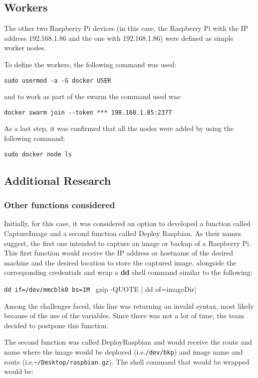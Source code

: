 \subsection{Workers}

The other two Raspberry Pi devices (in this case, the Raspberry Pi
with the IP address 192.168.1.86 and the one with 192.168.1.86) were
defined as simple worker nodes.
  
To define the workers, the following command was used:

\verb|sudo usermod -a -G docker USER|

and to work as part of the swarm the command used was:

\verb|docker swarm join --token *** 198.168.1.85:2377| 

As a
last step, it was confirmed that all the nodes were added by using the
following command: 

\verb|sudo docker node ls|
	
\subsection{Additional Research}
	
\subsubsection{Other functions considered}

Initially, for this case, it was considered an option to developed a
function called CaptureImage and a second function called Deploy
Raspbian.  As their names suggest, the first one intended to capture
an image or backup of a Raspberry Pi.  This first function would
receive the IP address or hostname of the desired machine and the
desired location to store the captured image, alongside the
corresponding credentials and wrap
a \textbf{dd} shell command similar to the following:

\verb|dd if=/dev/mmcblk0 bs=1M | gzip -QUOTE | dd of=imageDir|

Among the challenges faced, this line was returning an invalid syntax,
most likely because of the use of the variables.  Since there was not
a lot of time, the team decided to
postpone this function.
	
The second function was called DeployRaspbian and would receive the
route and name where the image would be deployed (i.e.\verb|/dev/bkp|) and
image name and route (i.e.\verb|~/Desktop/raspbian.gz|). The shell command
that would be wrapped would be: 

